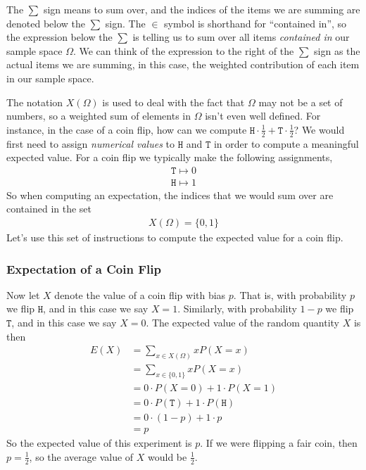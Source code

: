 \documentclass[11pt,letterpaper]{article}
\newcommand\hd{\texttt{H}}
\newcommand\tl{\texttt{T}}
\numberwithin{theorem}{section}
\numberwithin{definition}{section}
\numberwithin{lemma}{section}
\numberwithin{corollary}{section}
\numberwithin{proposition}{section}
\theoremstyle{definition}
\numberwithin{remark}{section}
\numberwithin{claim}{section}
\numberwithin{observation}{section}
\numberwithin{fact}{section}
\numberwithin{assumption}{section}
\numberwithin{example}{section}
\numberwithin{exercise}{section}
\begin{document}
The $\sum$ sign means to sum over, and the indices of the items we are summing are denoted below the $\sum$ sign. The $\in$ symbol is shorthand for ``contained in'', so the expression below the $\sum$ is telling us to sum over all items \textit{contained in} our sample space $\Omega$. We can think of the expression to the right of the $\sum$ sign as the actual items we are summing, in this case, the weighted contribution of each item in our sample space.

The notation $X(\Omega)$ is used to deal with the fact that $\Omega$ may not be a set of numbers, so a weighted sum of elements in $\Omega$ isn't even well defined. For instance, in the case of a coin flip, how can we compute $\hd \cdot \frac{1}{2} + \tl \cdot \frac{1}{2}$? We would first need to assign \textit{numerical values} to $\hd$ and $\tl$ in order to compute a meaningful expected value. For a coin flip we typically make the following assignments,
\begin{align*}
\tl \mapsto 0 \\
\hd \mapsto 1 
\end{align*}
So when computing an expectation, the indices that we would sum over are contained in the set
\begin{align*}
X(\Omega) = \{0,1\}
\end{align*}
Let's use this set of instructions to compute the expected value for a coin flip.

\subsubsection{Expectation of a Coin Flip}
Now let $X$ denote the value of a coin flip with bias $p$. That is, with probability $p$ we flip $\hd$, and in this case we say $X = 1$. Similarly, with probability $1-p$ we flip $\tl$, and in this case we say $X = 0$. The expected value of the random quantity $X$ is then
\begin{align*}
E(X) &= \sum_{x \in X(\Omega)} x P(X = x) \\
&= \sum_{x \in \{0,1\}} x P(X = x) \\
&= 0 \cdot P(X = 0) + 1 \cdot P(X = 1) \\
&= 0 \cdot P(\tl) + 1 \cdot P(\hd) \\
&= 0 \cdot (1-p) + 1 \cdot p \\
&= p
\end{align*}
So the expected value of this experiment is $p$. If we were flipping a fair coin, then $p = \frac{1}{2}$, so the average value of $X$ would be $\frac{1}{2}$.
\end{document}
